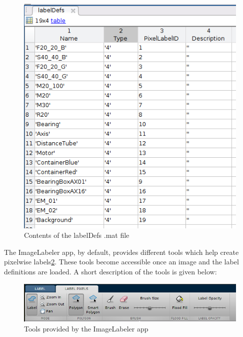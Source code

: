 	\begin{figure}[htb!]
		\centering
		\includegraphics[scale=0.7]{images/labelDef}
		\caption{Contents of the labelDefs .mat file}
		\label{Fig:labeldef}
	\end{figure}
	
The ImageLabeler app, by default, provides different tools which help create pixelwise labels\ref{Fig:IL_tools}. These tools become accessible once an image and the label definitions are loaded. A short description of the tools is given below:
	\begin{figure}[htb!]
		\centering
		\includegraphics[scale=0.55]{images/label_tools}
		\caption{Tools provided by the ImageLabeler app}
		\label{Fig:IL_tools}
	\end{figure}
	
